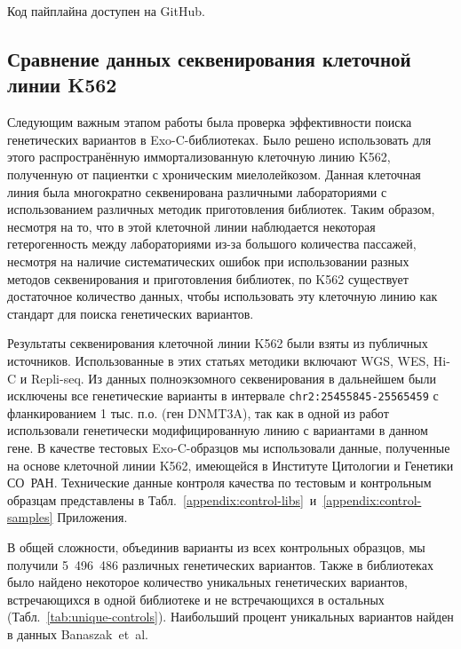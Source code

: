 \documentclass[a4paper,12pt]{article}
\begin{document}
Код пайплайна доступен на GitHub\cite{Scissors}.

\subsection{Сравнение данных секвенирования клеточной линии K562}

Следующим важным этапом работы была проверка эффективности поиска генетических вариантов в Exo-C-библиотеках.
Было решено использовать для этого распространённую иммортализованную клеточную линию K562, полученную от пациентки с хроническим миелолейкозом\cite{Lozzio_1975}.
Данная клеточная линия была многократно секвенирована различными лабораториями с использованием различных методик приготовления библиотек.
Таким образом, несмотря на то, что в этой клеточной линии наблюдается некоторая гетерогенность между лабораториями из-за большого количества пассажей, несмотря на наличие систематических ошибок при использовании разных методов секвенирования и приготовления библиотек, по K562 существует достаточное количество данных, чтобы использовать эту клеточную линию как стандарт для поиска генетических вариантов.

Результаты секвенирования клеточной линии K562 были взяты из публичных источников\cite{Banaszak_2018,Belaghzal_2017,Dixon_2018,Moquin_2017,Rao_2014,Ray_2019,Wang_2020,Zhou_2019}.
Использованные в этих статьях методики включают WGS, WES, Hi-C и Repli-seq.
Из данных полноэкзомного секвенирования в дальнейшем были исключены все генетические варианты в интервале \verb|chr2:25455845-25565459| с фланкированием 1 тыс. п.о. (ген DNMT3A), так как в одной из работ использовали генетически модифицированную линию с вариантами в данном гене\cite{Banaszak_2018}.
В качестве тестовых Exo-C-образцов мы использовали данные, полученные на основе клеточной линии K562, имеющейся в Институте Цитологии и Генетики СО~РАН.
Технические данные контроля качества по тестовым и контрольным образцам представлены в Табл.~\ref{appendix:control-libs}~и~\ref{appendix:control-samples} Приложения.

В общей сложности, объединив варианты из всех контрольных образцов, мы получили 5~496~486 различных генетических вариантов.
Также в библиотеках было найдено некоторое количество уникальных генетических вариантов, встречающихся в одной библиотеке и не встречающихся в остальных (Табл.~\ref{tab:unique-controls}).
Наибольший процент уникальных вариантов найден в данных Banaszak~et~al.
\end{document}
